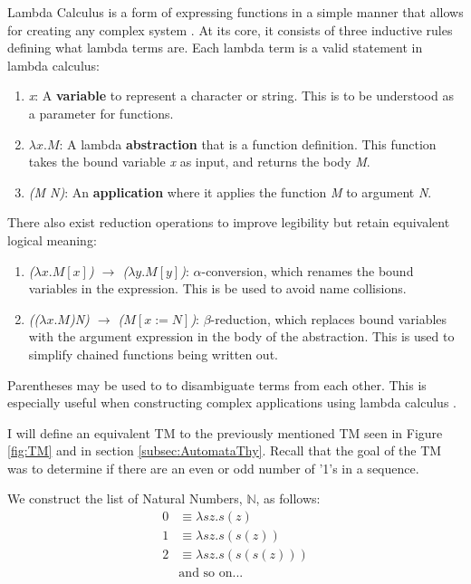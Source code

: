Lambda Calculus is a form of expressing functions in a simple manner that allows for creating any complex system \cite{LambdaCalcRG}.
At its core, it consists of three inductive rules defining what lambda terms are.
Each lambda term is a valid statement in lambda calculus:
\begin{enumerate}
    \item \textit{x}: A \textbf{variable} to represent a character or string.
    This is to be understood as a parameter for functions.
    \item \textit{$\lambda x.M$}: A lambda \textbf{abstraction} that is a function definition.
    This function takes the bound variable \textit{x} as input, and returns the body \textit{M}.
    \item \textit{(M N)}: An \textbf{application} where it applies the function \textit{M} to argument \textit{N}.
\end{enumerate}

There also exist reduction operations to improve legibility but retain equivalent logical meaning:
\begin{enumerate}
    \item \textit{($\lambda x.M[x]$) $\rightarrow$ ($\lambda y.M[y]$)}: $\alpha$-conversion, which renames the bound variables in the expression.
    This is be used to avoid name collisions.
    \item \textit{(($\lambda x.M$)\textit{N}) $\rightarrow$ ($M[x:=N]$)}: $\beta$-reduction, which replaces bound variables with the argument expression in the body of the abstraction.
    This is used to simplify chained functions being written out.
\end{enumerate}

Parentheses may be used to to disambiguate terms from each other.
This is especially useful when constructing complex applications using lambda calculus \cite{LambdaCalcWiki}.

I will define an equivalent TM to the previously mentioned TM seen in Figure \ref{fig:TM} and in section \ref{subsec:AutomataThy}.
Recall that the goal of the TM was to determine if there are an even or odd number of '1's in a sequence.

We construct the list of Natural Numbers, $\mathbb{N}$, as follows:
\[
    \begin{aligned}
        0 &\equiv \lambda sz.s(z)\\
        1 &\equiv \lambda sz.s(s(z))\\
        2 &\equiv \lambda sz.s(s(s(z)))\\
        &\text{and so on...}\\
    \end{aligned}
\]

